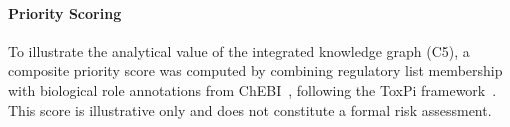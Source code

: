 \paragraph{Priority Scoring}
\label{sec:priority_score}

To illustrate the analytical value of the integrated knowledge graph (C5), a composite priority score was computed by combining regulatory list membership with biological role annotations from ChEBI~\cite{Degtyarenko2008}, following the ToxPi framework~\cite{Reif2010}. This score is illustrative only and does not constitute a formal risk assessment.